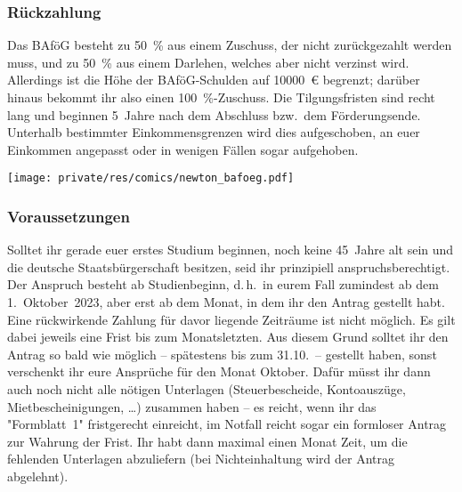 \begin{multicols}{2}
\subsubsection{Rückzahlung}
Das BAföG besteht zu \SI{50}{\percent} aus einem Zuschuss, der nicht zurückgezahlt werden muss, und zu \SI{50}{\percent} aus einem Darlehen, welches aber nicht verzinst wird.
Allerdings ist die Höhe der BAföG-Schulden auf \SI{10000}{\euro} begrenzt; darüber hinaus bekommt ihr also einen \SI{100}{\percent}-Zuschuss.
Die Tilgungsfristen sind recht lang und beginnen 5~Jahre nach dem Abschluss bzw.\ dem Förderungsende.
Unterhalb bestimmter Einkommensgrenzen wird dies aufgeschoben, an euer Einkommen angepasst oder in wenigen Fällen sogar aufgehoben.

\begin{center}
	\texttt{[image: private/res/comics/newton\_bafoeg.pdf]}
\end{center}

\subsubsection{Voraussetzungen}
Solltet ihr gerade euer erstes Studium beginnen, noch keine 45~Jahre alt sein und die deutsche Staatsbürgerschaft besitzen, seid ihr prinzipiell anspruchsberechtigt.
Der Anspruch besteht ab Studienbeginn, d.\,h.\ in eurem Fall zumindest ab dem 1.~Oktober~2023, aber erst ab dem Monat, in dem ihr den Antrag gestellt habt.
Eine rückwirkende Zahlung für davor liegende Zeiträume ist nicht möglich.
Es gilt dabei jeweils eine Frist bis zum Monatsletzten.
Aus diesem Grund solltet ihr den Antrag so bald wie möglich -- spätestens bis zum 31.10.\ -- gestellt haben, sonst verschenkt ihr eure Ansprüche für den Monat Oktober.
Dafür müsst ihr dann auch noch nicht alle nötigen Unterlagen (Steuerbescheide, Kontoauszüge, Mietbescheinigungen, \dots) zusammen haben -- es reicht, wenn ihr das "Formblatt~1" fristgerecht einreicht, im Notfall reicht sogar ein formloser Antrag zur Wahrung der Frist.
Ihr habt dann maximal einen Monat Zeit, um die fehlenden Unterlagen abzuliefern (bei Nichteinhaltung wird der Antrag abgelehnt).


\end{multicols}
